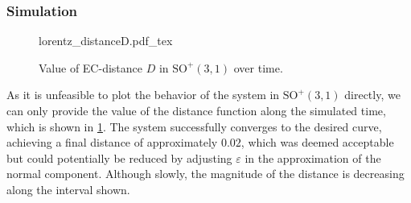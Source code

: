 \subsubsection{Simulation}
\begin{figure}[ht!]
    \centering
    \def\svgwidth{\linewidth}
    {\footnotesize{lorentz_distanceD.pdf_tex}}
    \caption{Value of EC-distance $D$ in $\text{SO}^+(3,1)$ over time.}
    \label{fig:lorentz-sim-distance-D}
\end{figure}
As it is unfeasible to plot the behavior of the system in $\text{SO}^+(3, 1)$ directly, we can only provide the value of the distance function along the simulated time, which is shown in \cref{fig:lorentz-sim-distance-D}. The system successfully converges to the desired curve, achieving a final distance of approximately $0.02$, which was deemed acceptable but could potentially be reduced by adjusting $\varepsilon$ in the approximation of the normal component. Although slowly, the magnitude of the distance is decreasing along the interval shown.


